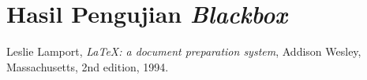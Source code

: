 \documentclass[bahasa, a4paper, 12pt]{report}
\begin{document}
		\section{Hasil Pengujian \emph{Blackbox}}
	
	
	\renewcommand\bibname{DAFTAR PUSTAKA}
	\begin{thebibliography}{9}
		
		Leslie Lamport,
		\textit{\LaTeX: a document preparation system},
		Addison Wesley, Massachusetts,
		2nd edition,
		1994.
		
	\end{thebibliography}

	
\end{document}
